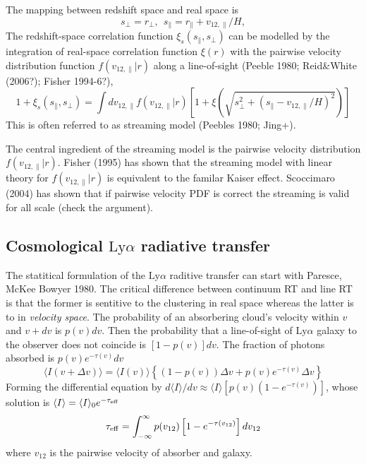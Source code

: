 \documentclass[useAMS,usenatbib,twocolumn]{mn2e}
\newcommand{\LyA}{\mbox{Ly}\alpha}
\begin{document}
The mapping between redshift space and real space is
\begin{equation}
s_\perp=r_\perp,~~s_\parallel=r_\parallel+v_{12,\parallel}/H,
\end{equation}
The redshift-space correlation function $\xi_s(s_\parallel,s_\perp)$ can be 
modelled by the integration of real-space correlation function $\xi(r)$
with the pairwise velocity distribution function $f(v_{12,\parallel}|r)$ along a 
line-of-sight (Peeble 1980; Reid\&White (2006?); Fisher 1994-6?),
\begin{equation}
1+\xi_s(s_\parallel,s_\perp)=\int dv_{12,\parallel}f(v_{12,\parallel}|r)
\left[1+\xi(\sqrt{s_\perp^2+(s_\parallel-v_{12,\parallel}/H)^2})\right]
\end{equation}
This is often referred to as streaming model (Peebles 1980; Jing+).

The central ingredient of the streaming model is the pairwise velocity
distribution $f(v_{12,\parallel}|r)$. Fisher (1995) has shown that the streaming
model with linear theory for $f(v_{12,\parallel}|r)$ is equivalent to the familar
Kaiser effect. Scoccimaro (2004) has shown that if pairwise velocity PDF is 
correct the streaming is valid for all scale (check the argument).


\subsection{Cosmological $\LyA$ radiative transfer}
The statitical formulation of the $\LyA$ raditive transfer can start
with Paresce, McKee Bowyer 1980. The critical difference between continuum
RT and line RT is that the former is sentitive to the clustering in real
space whereas the latter is to in \textit{velocity space}.
The probability of an absorbering cloud's velocity within $v$ and $v+dv$
is $p(v)dv$. Then the probability that a line-of-sight of $\LyA$ galaxy to 
the observer does not coincide is $[1-p(v)]dv$. The fraction of photons absorbed
is $p(v)e^{-\tau(v)}dv$
\begin{equation}
\langle I(v+\Delta v)\rangle=\langle I(v)\rangle
\left\{
(1-p(v))\Delta v+p(v)e^{-\tau(v)}\Delta v
\right\}
\end{equation}
Forming the differential equation by $d\langle I\rangle/dv\approx
\langle I\rangle[p(v)(1-e^{-\tau(v)})]$, whose solution is
$\langle I\rangle=\langle I\rangle_0e^{-\tau_{\rm{eff}}}$
\begin{equation}
\tau_{\rm{eff}}=\int_{-\infty}^\infty p(v_{12})\left[1-e^{-\tau(v_{12})}\right]dv_{12}
\end{equation}
where $v_{12}$ is the pairwise velocity of absorber and galaxy.
\end{document}
